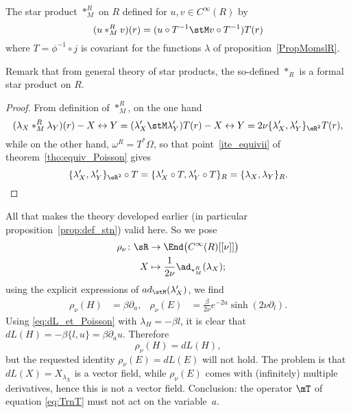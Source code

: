\begin{corollary}
	The star product $\ast_M^R$ on $R$ defined for $u,v\in C^{\infty}(R)$ by
	\begin{equation}
		(u\ast_M^R v)(r)=( u\circ T^{-1}\stM v\circ T^{-1} )T(r)
	\end{equation}
	where $T=\phi^{-1}\circ j$ is covariant for the functions $\lambda$ of proposition~\ref{PropMomslR}.

\end{corollary}
Remark that from general theory of star products, the so-defined $\ast_R$ is a formal star product on $R$.

\begin{proof}
	From definition of $\ast_M^R$, on the one hand
	\[
		(\lambda_X\ast_M^R \lambda_Y)(r)-X\leftrightarrow Y=(\lambda'_X\stM\lambda'_Y)T(r)-X\leftrightarrow Y
		=2\nu\{  \lambda'_X,\lambda'_Y \}_{\eR^2}T(r),
	\]
	while on the other hand, $\omega^R=T^*\Omega$, so that point~\ref{ite_equivii} of theorem~\ref{tho:equiv_Poisson}  gives
	\[
		\{ \lambda'_X,\lambda'_Y \}_{\eR^2}\circ T=\{ \lambda'_X\circ T,\lambda'_Y\circ T \}_R=\{ \lambda_X,\lambda_Y \}_R.
	\]

\end{proof}

All that makes the theory developed earlier (in particular proposition~\ref{prop:def_stn}) valid here. So we pose
\begin{equation}
	\begin{aligned}
		{\rho_{\nu}}\colon\sR & \to {\End\big(  C^{\infty}(R)[ [\nu]] \big)}       \\
		X                     & \mapsto {\frac{1}{2\nu}\ad_{\ast_M^R}(\lambda_X);}
	\end{aligned}
\end{equation}
using the explicit expressions of $ad_{\stM}(\lambda'_X)$, we find
\begin{align}
	\rho_{\nu}(H) & =\beta\partial_a, & \rho_{\nu}(E) & =\frac{\beta}{2\nu}e^{-2a}\sinh(2\nu\partial_l).
\end{align}
Using \eqref{eq:dL_et_Poisson} with $\lambda_H=-\beta l$, it is clear that $dL(H)=-\beta\{l,u\}=\beta\partial_a u$. Therefore
\begin{equation}
	\rho_{\nu}(H)=dL(H),
\end{equation}
but the requested identity $\rho_{\nu}(E)=dL(E)$ will not hold. The problem is that $dL(X)=X_{\lambda_X}$ is a vector field, while $\rho_{\nu}(E)$ comes with (infinitely) multiple derivatives, hence this is not a vector field. Conclusion: the operator $\mT$ of equation \eqref{eq:TrnT} must not act on the variable~$a$.

